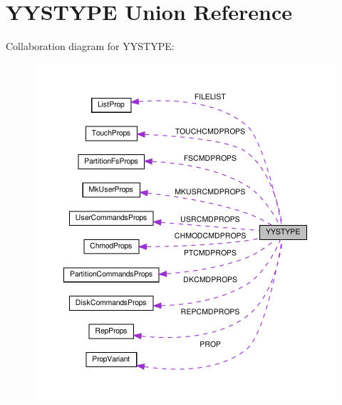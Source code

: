 \hypertarget{unionYYSTYPE}{}\section{Y\+Y\+S\+T\+Y\+PE Union Reference}
\label{unionYYSTYPE}


Collaboration diagram for Y\+Y\+S\+T\+Y\+PE\+:\nopagebreak
\begin{figure}[H]
\begin{center}
\leavevmode
\includegraphics[width=350pt]{unionYYSTYPE__coll__graph}
\end{center}
\end{figure}

